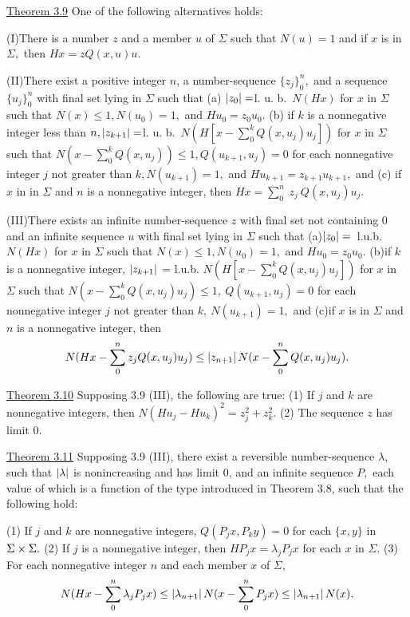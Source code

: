 \underline{Theorem 3.9}  One of the following alternatives holds:\nl

\indent (I)\qquad There is a number $z$ and a member $u$ of $\Sigma$ such that $N(u) = 1$ and if $x$ is in $\Sigma,$ then $Hx = zQ(x,u)u.$\nl

\indent (II)\qquad There exist a positive integer $n$, a number-sequence $\{z_{j}\}_{0}^{n},$ and a sequence $\{u_{j}\}_{0}^{n}$ with final set lying in $\Sigma$ such that \nl
(a) $\left|z_{0}\right| = $l. u. b.~$N(Hx)$ for $x$ in $\Sigma$ such that $N(x) \leq 1, N(u_{0}) = 1,$ and $Hu_{0} = z_{0}u_{0}.$\nl
(b) if $k$ is a nonnegative integer less than $n, \left|z_{k+1}\right| = $l. u. b.~$N(H[x-\sum_{0}^{k}Q(x,u_{j})u_{j}])$ for $x$ in $\Sigma$ such that $N(x - \sum_{0}^{k}Q(x,u_{j})     ) \leq 1, Q(u_{k+1},u_{j}) = 0$ for each nonnegative integer $j$ not greater than $k, N(u_{k+1}) = 1,$ and $Hu_{k+1} = z_{k+1}u_{k+1},$ and\nl
(c) if $x$ in in $\Sigma$ and $n$ is a nonnegative integer, then $Hx = \sum_{0}^{n}~z_{j}~Q(x,u_{j})u_{j}.$\nl

\indent(III)\qquad There exists an infinite number-sequence $z$ with final set not containing $0$ and an infinite sequence $u$ with final set lying in $\Sigma$ such that\nl
(a)\qquad$\left|z_{0}\right| =$~l.u.b. $N(Hx)$ for $x$ in $\Sigma$ such that $N(x)\leq 1, N(u_{0}) = 1,$ and $Hu_{0} = z_{0}u_{0}.$\nl
(b)\qquad if $k$ is a nonnegative integer, $\left|z_{k+1}\right|$ = l.u.b. $N(H[x - \sum_{0}^{k}Q(x,u_{j})u_{j}])$ for $x$ in $\Sigma$ such that $N(x - \sum_{0}^{k}Q(x,u_{j})u_{j}) \leq 1,~Q(u_{k+1},u_{j}) = 0$ for each nonnegative integer $j$ not greater than $k,~N(u_{k+1}) = 1,$ and \nl
(c)\qquad if $x$ is in $\Sigma$ and $n$ is a nonnegative integer, then\nl
\[
N(Hx - \sum_{0}^{n}z_{j}Q(x,u_{j})u_{j}) \leq \left|z_{n+1}\right|N(x - \sum_{0}^{n}Q(x,u_{j})u_{j}).
\]

\underline{Theorem 3.10}  Supposing 3.9 (III), the following are true:\nl
\indent (1) If $j$ and $k$ are nonnegative integers, then $N(Hu_{j} - Hu_{k})^{2} = z_{j}^{2} + z_{k}^{2}.$\nl
\indent (2) The sequence $z$ has limit $0.$\nl

\underline{Theorem 3.11}  Supposing 3.9 (III), there exist a reversible number-sequence $\lambda,$ such that $\left|\lambda\right|$ is nonincreasing and has limit $0$, and an infinite sequence $P,$ each value of which is a function of the type introduced in Theorem 3.8, such that the following hold:\nl

\indent (1)  If $j$ and $k$ are nonnegative integers, $Q(P_{j}x,P_{k}y) = 0$ for each $\{x,y\}$ in $\Sigma \times \Sigma.$\nl
\indent (2)  If $j$ is a nonnegative integer, then $HP_{j}x = \lambda_{j}P_{j}x$ for each $x$ in $\Sigma.$\nl
\indent (3)  For each nonnegative integer $n$ and each member $x$ of $\Sigma,$\nl
\[
N(Hx - \sum_{0}^{n}\lambda_{j}P_{j}x) \leq \left|\lambda_{n+1}\right|N(x - \sum_{0}^{n}P_{j}x) \leq \left|\lambda_{n+1}\right|N(x).
\]

